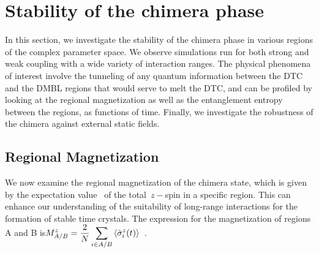 \documentclass[12pt]{iopart}
\begin{document}
	\section{\label{sec:level4} Stability of the chimera phase}
	In this section, we investigate the stability of the chimera phase in various regions of the complex parameter space. We observe simulations run for both strong and weak coupling with a wide variety of interaction ranges. The physical phenomena of interest involve the tunneling of any quantum information between the DTC and the DMBL regions that would serve to melt the DTC, and can be profiled by looking at the regional magnetization as well as the entanglement entropy between the regions, as functions of time. Finally, we investigate the robustness of the chimera against external static fields.
	
	\subsection{\label{sec:level42} Regional Magnetization}
	
	We now examine the regional magnetization of the chimera state, which is given by the expectation value  of the total $z-$spin in a specific region. This can enhance our understanding of the suitability of long-range interactions for the formation of stable time crystals. The expression for the magnetization of regions A and B is$\displaystyle M^z_{A/B}=\frac{2}{N}\sum_{i\in{A/B}}\expval{\hat{\sigma}^z_i(t)}$~\cite{sakurai_phys_nodate}.
	
\end{document}

